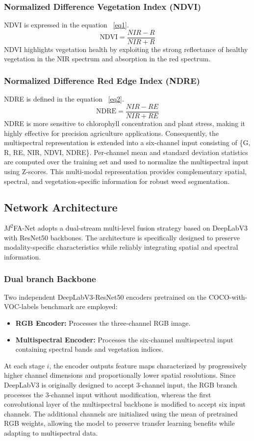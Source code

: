\documentclass[pdflatex,sn-mathphys-num]{sn-jnl}
\begin{document}
\subsubsection{Normalized Difference Vegetation Index (NDVI)}
NDVI is expressed in the equation ~\ref{eq1}.
\begin{equation}
\text{NDVI} = \frac{NIR - R}{NIR + R}\label{eq1}
\end{equation}
NDVI \cite{rouse1974ndvi} highlights vegetation health by exploiting the strong reflectance of healthy vegetation in the NIR spectrum and absorption in the red spectrum.
\subsubsection{Normalized Difference Red Edge Index (NDRE)}
NDRE is defined in the equation ~\ref{eq2}.
\begin{equation}
\text{NDRE} = \frac{NIR - RE}{NIR + RE}\label{eq2}
\end{equation}
NDRE \cite{gitelson1997chlorophyll} is more sensitive to chlorophyll concentration and plant stress, making it highly effective for precision agriculture applications. Consequently, the multispectral representation is extended into a six-channel input consisting of \{G, R, RE, NIR, NDVI, NDRE\}. Per-channel mean and standard deviation statistics are computed over the training set and used to normalize the multispectral input using Z-scores. This multi-modal representation provides complementary spatial, spectral, and vegetation-specific information for robust weed segmentation.

\subsection{Network Architecture}
$M^2$FA-Net adopts a dual-stream multi-level fusion strategy based on DeepLabV3 with ResNet50 backbones. The architecture is specifically designed to preserve modality-specific characteristics while reliably integrating spatial and spectral information.
\subsubsection{Dual branch Backbone}
Two independent DeepLabV3-ResNet50 encoders pretrained on the COCO-with-VOC-labels benchmark are employed:
\begin{itemize}
    \item \textbf{RGB Encoder:} Processes the three-channel RGB image.
    \item \textbf{Multispectral Encoder:} Processes the six-channel multispectral input containing spectral bands and vegetation indices.
\end{itemize}
At each stage $i$, the encoder outputs feature maps characterized by progressively higher channel dimensions and proportionally lower spatial resolutions.  Since DeepLabV3 is originally designed to accept 3-channel input, the RGB branch processes the 3-channel input without modification, whereas the first convolutional layer of the multispectral backbone is modified to accept six input channels. The additional channels are initialized using the mean of pretrained RGB weights, allowing the model to preserve transfer learning benefits while adapting to multispectral data.
\end{document}
